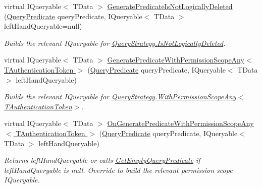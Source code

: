 \begin{DoxyCompactItemize}
virtual I\+Queryable$<$ T\+Data $>$ \hyperlink{classCqrs_1_1Repositories_1_1Queries_1_1QueryBuilder_a6095cfcbd824578e7c70e2028e1ac6ad_a6095cfcbd824578e7c70e2028e1ac6ad}{Generate\+Predicate\+Is\+Not\+Logically\+Deleted} (\hyperlink{classCqrs_1_1Repositories_1_1Queries_1_1QueryPredicate}{Query\+Predicate} query\+Predicate, I\+Queryable$<$ T\+Data $>$ left\+Hand\+Queryable=null)
\begin{DoxyCompactList}\small\item\em Builds the relevant I\+Queryable for \hyperlink{classCqrs_1_1Repositories_1_1Queries_1_1QueryStrategy_ab1841119fbbb58337d55b014a8b260b4_ab1841119fbbb58337d55b014a8b260b4}{Query\+Strategy.\+Is\+Not\+Logically\+Deleted}. \end{DoxyCompactList}\item 
virtual I\+Queryable$<$ T\+Data $>$ \hyperlink{classCqrs_1_1Repositories_1_1Queries_1_1QueryBuilder_a7768a63fd46f991f87a00b51484c2f34_a7768a63fd46f991f87a00b51484c2f34}{Generate\+Predicate\+With\+Permission\+Scope\+Any$<$ T\+Authentication\+Token $>$} (\hyperlink{classCqrs_1_1Repositories_1_1Queries_1_1QueryPredicate}{Query\+Predicate} query\+Predicate, I\+Queryable$<$ T\+Data $>$ left\+Hand\+Queryable)
\begin{DoxyCompactList}\small\item\em Builds the relevant I\+Queryable for \hyperlink{classCqrs_1_1Repositories_1_1Queries_1_1QueryStrategy_a7fda4380a88972201258bf695ccaf287_a7fda4380a88972201258bf695ccaf287}{Query\+Strategy.\+With\+Permission\+Scope\+Any$<$\+T\+Authentication\+Token$>$}. \end{DoxyCompactList}\item 
virtual I\+Queryable$<$ T\+Data $>$ \hyperlink{classCqrs_1_1Repositories_1_1Queries_1_1QueryBuilder_aee213115d002518b78463c7bc5fb5c52_aee213115d002518b78463c7bc5fb5c52}{On\+Generate\+Predicate\+With\+Permission\+Scope\+Any$<$ T\+Authentication\+Token $>$} (\hyperlink{classCqrs_1_1Repositories_1_1Queries_1_1QueryPredicate}{Query\+Predicate} query\+Predicate, I\+Queryable$<$ T\+Data $>$ left\+Hand\+Queryable)
\begin{DoxyCompactList}\small\item\em Returns {\itshape left\+Hand\+Queryable}  or calls \hyperlink{classCqrs_1_1Repositories_1_1Queries_1_1QueryBuilder_a7dc8f0da3bb4ef54b8cbdda6c50ee0a1_a7dc8f0da3bb4ef54b8cbdda6c50ee0a1}{Get\+Empty\+Query\+Predicate} if {\itshape left\+Hand\+Queryable}  is null. Override to build the relevant permission scope I\+Queryable. \end{DoxyCompactList}\item 

\end{DoxyCompactItemize}
